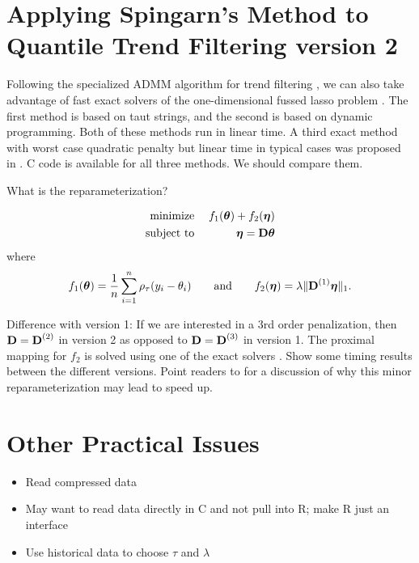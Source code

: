 \documentclass{article}
\newcommand{\V}[1]{{\bm{\mathbf{\MakeLowercase{#1}}}}} %
\newcommand{\VE}[2]{\MakeLowercase{#1}_{#2}} %
\newcommand{\M}[1]{{\bm{\mathbf{\MakeUppercase{#1}}}}} %
\newcommand{\Mn}[2]{\M{#1}^{(#2)}} %
\begin{document}
\section{Applying Spingarn's Method to Quantile Trend Filtering version 2}

Following the specialized ADMM algorithm for trend filtering \cite{Ramdas2016}, we can also take advantage of fast exact solvers of the one-dimensional fussed lasso problem \cite{davies2001, Johnson2013}. The first method is based on taut strings, and the second is based on dynamic programming. Both of these methods run in linear time. A third exact method with worst case quadratic penalty but linear time in typical cases was proposed in \cite{Condat2013}. C code is available for all three methods. We should compare them.

What is the reparameterization?

\begin{eqnarray*}
\text{minimize}\; && f_1(\V{\theta}) + f_2(\V{\eta}) \\
\text{subject to}\; && \V{\eta} = \M{D}\V{\theta}
\end{eqnarray*}
where
\begin{eqnarray*}
f_1(\V{\theta}) = \frac{1}{n}\sum_{i=1}^n \rho_\tau(\VE{y}{i} - \VE{\theta}{i}) \quad\quad \text{and} \quad\quad
f_2(\V{\eta}) = \lambda\lVert \Mn{D}{1}\V{\eta} \rVert_1.
\end{eqnarray*}

Difference with version 1: If we are interested in a 3rd order penalization, then $\M{D} = \Mn{D}{2}$ in version 2 as opposed to $\M{D} = \Mn{D}{3}$ in version 1. The proximal mapping for $f_2$ is solved using one of the exact solvers \cite{davies2001, Johnson2013, Condat2013}. Show some timing results between the different versions. Point readers to \cite{Ramdas2016} for a discussion of why this minor reparameterization may lead to speed up.

\section{Other Practical Issues}

\begin{itemize}
	\item Read compressed data
	\item May want to read data directly in C and not pull into R; make R just an interface
	\item Use historical data to choose $\tau$ and $\lambda$
\end{itemize}
\end{document}
